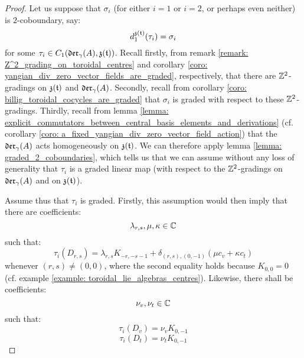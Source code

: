             \begin{proof}
                Let us suppose that $\sigma_i$ (for either $i = 1$ or $i = 2$, or perhaps even neither) is $2$-coboundary, say:
                    $$d_1^{\mathfrak{z}(\mathfrak{t})}(\tau_i) = \sigma_i$$
                for some $\tau_i \in C_1(\mathfrak{der}_{\gamma}(A), \mathfrak{z}(\mathfrak{t}))$. Recall firstly, from remark \ref{remark: Z^2_grading_on_toroidal_centres} and corollary \ref{coro: yangian_div_zero_vector_fields_are_graded}, respectively, that there are $\mathbb{Z}^2$-gradings on $\mathfrak{z}(\mathfrak{t})$ and $\mathfrak{der}_{\gamma}(A)$. Secondly, recall from corollary \ref{coro: billig_toroidal_cocycles_are_graded} that $\sigma_i$ is graded with respect to these $\mathbb{Z}^2$-gradings. Thirdly, recall from lemma \ref{lemma: explicit_commutators_between_central_basis_elements_and_derivations} (cf. corollary \ref{coro: a_fixed_yangian_div_zero_vector_field_action}) that the $\mathfrak{der}_{\gamma}(A)$ acts homogeneously on $\mathfrak{z}(\mathfrak{t})$. We can therefore apply lemma \ref{lemma: graded_2_coboundaries}, which tells us that we can assume without any loss of generality that $\tau_i$ is a graded linear map (with respect to the $\mathbb{Z}^2$-gradings on $\mathfrak{der}_{\gamma}(A)$ and on $\mathfrak{z}(\mathfrak{t})$).
            
                Assume thus that $\tau_i$ is graded. Firstly, this assumption would then imply that there are coefficients:
                    $$\lambda_{r, s}, \mu, \kappa \in \mathbb{C}$$
                such that:
                    $$\tau_i(D_{r, s}) = \lambda_{r, s} K_{-r, -s - 1} + \delta_{(r, s), (0, -1)} ( \mu c_v + \kappa c_t )$$
                whenever $(r, s) \not = (0, 0)$, where the second equality holds because $K_{0, 0} = 0$ (cf. example \ref{example: toroidal_lie_algebras_centres}). Likewise, there shall be coefficients:
                    $$\nu_v, \nu_t \in \mathbb{C}$$
                such that:
                    $$\tau_i(D_v) = \nu_v K_{0, -1}$$
                    $$\tau_i(D_t) = \nu_t K_{0, -1}$$


\end{proof}
